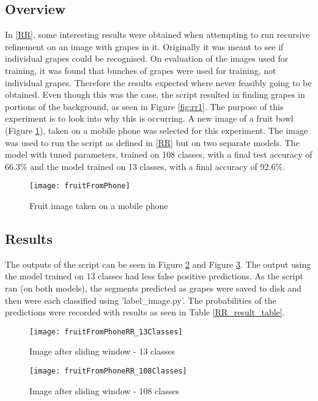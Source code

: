 \subsection*{Overview}
In \ref{RR}, some interesting results were obtained when attempting to run recursive refinement on an image with grapes in it.
Originally it was meant to see if individual grapes could be recognised.
On evaluation of the images used for training, it was found that bunches of grapes were used for training, not individual grapes. Therefore the results expected where never feasibly going to be obtained.
Even though this was the case, the script resulted in finding grapes in portions of the background, as seen in Figure \ref{fig:rr1}.
The purpose of this experiment is to look into why this is occurring.
A new image of a fruit bowl (Figure \ref{fig:fruitFromPhone}), taken on a mobile phone was selected for this experiment.
The image was used to run the script as defined in \ref{RR} but on two separate models.
The model with tuned parameters, trained on 108 classes, with a final test accuracy of 66.3\% and the model trained on 13 classes, with a final accuracy of 92.6\%.

\begin{figure}[h]
\centering
    \texttt{[image: fruitFromPhone]}
      \caption{Fruit image taken on a mobile phone}
      \label{fig:fruitFromPhone}
\end{figure}

\subsection*{Results}
The outputs of the script can be seen in Figure \ref{fig:fruitRR13} and Figure \ref{fig:fruitRR108}. The output using the model trained on 13 classes had less false positive predictions. As the script ran (on both models), the segments predicted as grapes were saved to disk and then were each classified using 'label\_image.py'. The probabilities of the predictions were recorded with results as seen in Table \ref{RR_result_table}.

\begin{figure}[h]
\centering
    \texttt{[image: fruitFromPhoneRR\_13Classes]}
      \caption{Image after sliding window - 13 classes}
      \label{fig:fruitRR13}
\end{figure}

\begin{figure}[h]
	\centering
    \texttt{[image: fruitFromPhoneRR\_108Classes]}
      \caption{Image after sliding window - 108 classes}
      \label{fig:fruitRR108}
\end{figure}

